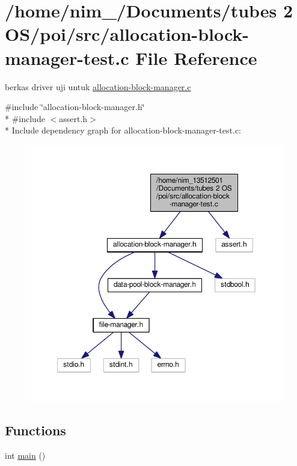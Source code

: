 \hypertarget{allocation-block-manager-test_8c}{\section{/home/nim\-\_/\-Documents/tubes 2 O\-S/poi/src/allocation-\/block-\/manager-\/test.c File Reference}
\label{allocation-block-manager-test_8c}
}


berkas driver uji untuk \hyperlink{allocation-block-manager_8c}{allocation-\/block-\/manager.\-c}  


{\ttfamily \#include \char`\"{}allocation-\/block-\/manager.\-h\char`\"{}}\\*
{\ttfamily \#include $<$assert.\-h$>$}\\*
Include dependency graph for allocation-\/block-\/manager-\/test.c\-:\nopagebreak
\begin{figure}[H]
\begin{center}
\leavevmode
\includegraphics[width=350pt]{allocation-block-manager-test_8c__incl}
\end{center}
\end{figure}
\subsection*{Functions}
\begin{DoxyCompactItemize}
\item 
int \hyperlink{allocation-block-manager-test_8c_ae66f6b31b5ad750f1fe042a706a4e3d4}{main} ()
\end{DoxyCompactItemize}


